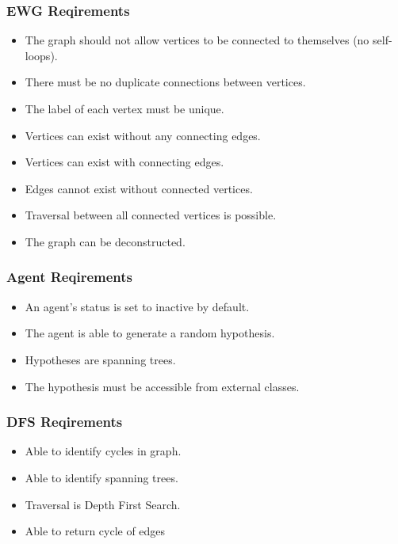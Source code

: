 \documentclass{AISB2008}
\begin{document}
\subsubsection{EWG Reqirements}

\begin{itemize}
\item The graph should not allow vertices to be connected to themselves (no self-loops).
\item There must be no duplicate connections between vertices.
\item The label of each vertex must be unique.
\item Vertices can exist without any connecting edges.
\item Vertices can exist with connecting edges.
\item Edges cannot exist without connected vertices.
\item Traversal between all connected vertices is possible.
\item The graph can be deconstructed.
\end{itemize}


\subsubsection{Agent Reqirements}

\begin{itemize}
\item An agent’s status is set to inactive by default.
\item The agent is able to generate a random hypothesis.
\item Hypotheses are spanning trees.
\item The hypothesis must be accessible from external classes.
\end{itemize}


\subsubsection{DFS Reqirements}

\begin{itemize}
\item Able to identify cycles in graph.
\item Able to identify spanning trees.
\item Traversal is Depth First Search.
\item Able to return cycle of edges
\end{itemize}
\end{document}
